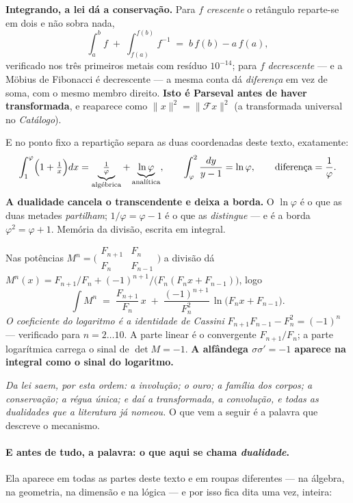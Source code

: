 \documentclass[livro.tex]{subfiles}
\begin{document}
\medskip
\noindent \textbf{Integrando, a lei dá a conservação.} Para $f$ \emph{crescente} o retângulo
reparte-se em dois e não sobra nada,
\[
  \int_a^{b} f  \;+\; \int_{f(a)}^{f(b)} f^{-1} \;=\; b\,f(b) - a\,f(a) ,
\]
verificado nos três primeiros metais com resíduo $10^{-14}$; para $f$ \emph{decrescente} --- e a
Möbius de Fibonacci é decrescente --- a mesma conta dá \emph{diferença} em vez de soma, com o mesmo
membro direito. \textbf{Isto é Parseval antes de haver transformada}, e reaparece como
$\|x\|^2=\|\mathcal F x\|^2$ (a transformada universal no \emph{Catálogo}).

\medskip
\noindent E no ponto fixo a repartição separa as duas coordenadas deste texto, exatamente:
\[
  \int_1^{\varphi}\Bigl(1+\tfrac1x\Bigr)dx=\underbrace{\tfrac1\varphi}_{\text{algébrica}}+\underbrace{\ln\varphi}_{\text{analítica}},
  \qquad
  \int_{\varphi}^{2}\frac{dy}{y-1}=\ln\varphi ,
  \qquad
  \text{diferença}=\frac1\varphi .
\]
\textbf{A dualidade cancela o transcendente e deixa a borda.} O $\ln\varphi$ é o que as duas
metades \emph{partilham}; $1/\varphi=\varphi-1$ é o que as \emph{distingue} --- e é a borda
$\varphi^{2}=\varphi+1$. Memória da divisão, escrita em integral.

\medskip
\noindent Nas potências $M^{n}=\bigl(\begin{smallmatrix}F_{n+1}&F_n\\F_n&F_{n-1}\end{smallmatrix}\bigr)$ a
divisão dá $M^{n}(x)=F_{n+1}/F_n+(-1)^{n+1}\!/\bigl(F_n(F_nx+F_{n-1})\bigr)$, logo
\[
  \int M^{n} \;=\; \frac{F_{n+1}}{F_n}\,x \;+\; \frac{(-1)^{n+1}}{F_n^{2}}\,\ln\bigl(F_nx+F_{n-1}\bigr) .
\]
\emph{O coeficiente do logaritmo é a identidade de Cassini} $F_{n+1}F_{n-1}-F_n^{2}=(-1)^n$ ---
verificado para $n=2\ldots10$. A parte linear é o convergente $F_{n+1}/F_n$; a parte logarítmica
carrega o sinal de $\det M=-1$. \textbf{A alfândega $\sigma\sigma'=-1$ aparece na integral como o
sinal do logaritmo.}


\medskip
\noindent \emph{Da lei saem, por esta ordem: a involução; o ouro; a família dos corpos; a
conservação; a régua única; e daí a transformada, a convolução, e todas as dualidades que a
literatura já nomeou.} O que vem a seguir é a palavra que descreve o mecanismo.

\paragraph{E antes de tudo, a palavra: o que aqui se chama \emph{dualidade}.} Ela aparece em
todas as partes deste texto e em roupas diferentes --- na álgebra, na geometria, na dimensão e na
lógica --- e por isso fica dita uma vez, inteira:
\end{document}
